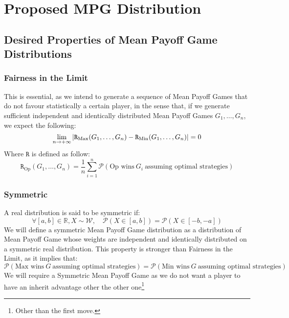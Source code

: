 \section{Proposed MPG Distribution}
\subsection{Desired Properties of Mean Payoff Game Distributions}
\subsubsection{Fairness in the Limit}
This is essential, as we intend to generate a sequence of Mean Payoff Games that do not favour statistically a certain player, in the sense that, if we generate sufficient independent and identically distributed Mean Payoff Games $G_1,\dots,G_n$, we expect the following:
$$
\lim_{n\rightarrow +\infty} \left\lvert \mathtt{R}_{\operatorname{Max}}(G_1,\dots,G_n)-\mathtt{R}_{\operatorname{Min}}(G_1,\dots,G_n)\right \rvert = 0
$$
Where $\mathtt{R}$ is defined as follow:
$$
\mathtt{R}_{\text{Op}}(G_1,\dots,G_n)=\frac{1}{n}\sum_{i=1}^n\mathscr{P}(\text{Op wins} \ G_i\ \text{assuming optimal strategies})
$$
\subsubsection{Symmetric}
A real distribution is said to be symmetric if:
$$
\forall [a,b]\in \mathbb{R},X\sim \mathcal{W},\quad \mathscr{P}(X\in [a,b]) = \mathscr{P}(X\in [-b,-a])
$$
We will define a symmetric Mean Payoff Game distribution as a distribution of Mean Payoff Game whose weights are independent and identically distributed on a symmetric real distribution.
This property is stronger than Fairness in the Limit, as it implies that:
$$
\mathscr{P}(\text{Max wins} \ G\ \text{assuming optimal strategies}) = \mathscr{P}(\text{Min wins} \ G\ \text{assuming optimal strategies})
$$
We will require a Symmetric Mean Payoff Game as we do not want a player to have an inherit advantage other the other one\footnote{Other than the first move.}
